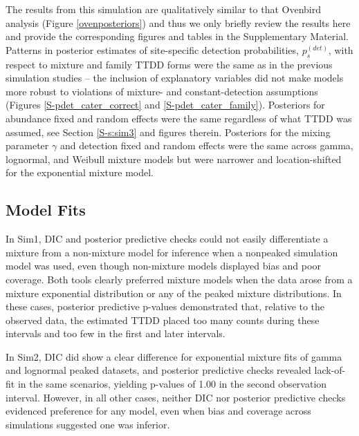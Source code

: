 \documentclass[12pt]{article}
\newif\ifdic   %
\newcommand{\pdet}{p^{(det)}}
\begin{document}
The results from this simulation are qualitatively similar to that Ovenbird analysis (Figure \ref{ovenposteriors}) and thus we only briefly review the results here and provide the corresponding figures and tables in the Supplementary Material. 
Patterns in posterior estimates of site-specific detection probabilities, $\pdet_s$, with respect to mixture and family TTDD forms were the same as in the previous simulation studies -- the inclusion of explanatory variables did not make models more robust to violations of mixture- and constant-detection assumptions (Figures \ref{S-pdet_cater_correct} and \ref{S-pdet_cater_family}).  
Posteriors for abundance fixed and random effects were the same regardless of what TTDD was assumed, see Section \ref{S-s:sim3} and figures therein.  
Posteriors for the mixing parameter $\gamma$ and detection fixed and random effects were the same across gamma, lognormal, and Weibull mixture models but were narrower and location-shifted for the exponential mixture model.  






\ifdic
\subsection{Model Fits}\label{sec:fits}

In Sim1, DIC and posterior predictive checks could not easily differentiate a mixture from a non-mixture model for inference when a nonpeaked simulation model was used, even though non-mixture models displayed bias and poor coverage.
Both tools clearly preferred mixture models when the data arose from a mixture exponential distribution or any of the peaked mixture distributions. 
In these cases, posterior predictive p-values demonstrated that, relative to the observed data, the estimated TTDD placed too many counts during these intervals and too few in the first and later intervals.

In Sim2, DIC did show a clear difference for exponential mixture fits of gamma and lognormal peaked datasets, and posterior predictive checks revealed lack-of-fit in the same scenarios, yielding p-values of 1.00 in the second observation interval.
However, in all other cases, neither DIC nor posterior predictive checks evidenced preference for any model, even when bias and coverage across simulations suggested one was inferior.  
\end{document}
